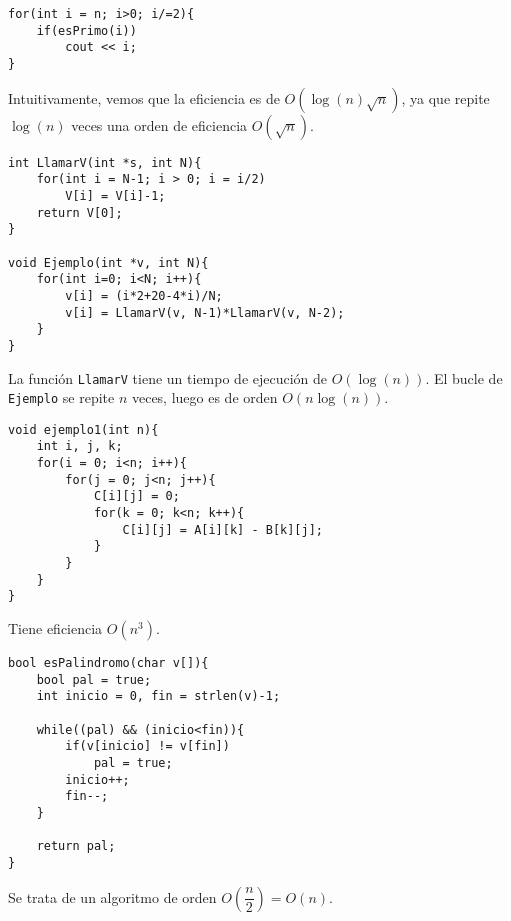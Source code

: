 \begin{ejemplo}
\begin{listing}[H]
\begin{verbatim}
for(int i = n; i>0; i/=2){
    if(esPrimo(i))
        cout << i;
}
\end{verbatim}
\end{listing}
Intuitivamente, vemos que la eficiencia es de $O(\log(n)\sqrt{n})$, ya que repite $\log(n)$ veces una orden de eficiencia $O(\sqrt{n})$.
\end{ejemplo}

\begin{ejemplo}
\begin{listing}[H]
\begin{verbatim}
int LlamarV(int *s, int N){
    for(int i = N-1; i > 0; i = i/2)
        V[i] = V[i]-1;
    return V[0];
}

void Ejemplo(int *v, int N){
    for(int i=0; i<N; i++){
        v[i] = (i*2+20-4*i)/N;
        v[i] = LlamarV(v, N-1)*LlamarV(v, N-2);
    }
}
\end{verbatim}
\end{listing}
La función \verb|LlamarV| tiene un tiempo de ejecución de $O(\log(n))$.  
El bucle de \verb|Ejemplo| se repite $n$ veces, luego es de orden $O(n\log(n))$.
\end{ejemplo}

\begin{ejemplo}
\begin{listing}[H]
\begin{verbatim}
void ejemplo1(int n){
    int i, j, k;
    for(i = 0; i<n; i++){
        for(j = 0; j<n; j++){
            C[i][j] = 0;
            for(k = 0; k<n; k++){
                C[i][j] = A[i][k] - B[k][j];
            }
        }
    }
}
\end{verbatim}
\end{listing}
Tiene eficiencia $O(n^3)$.
\end{ejemplo}

\begin{ejemplo}
\begin{listing}[H]
\begin{verbatim}
bool esPalindromo(char v[]){
    bool pal = true;
    int inicio = 0, fin = strlen(v)-1;
    
    while((pal) && (inicio<fin)){
        if(v[inicio] != v[fin])
            pal = true;
        inicio++;
        fin--;
    }
    
    return pal;
}
\end{verbatim}
\end{listing}
Se trata de un algoritmo de orden $O\left(\dfrac{n}{2}\right) = O(n)$.
\end{ejemplo}

